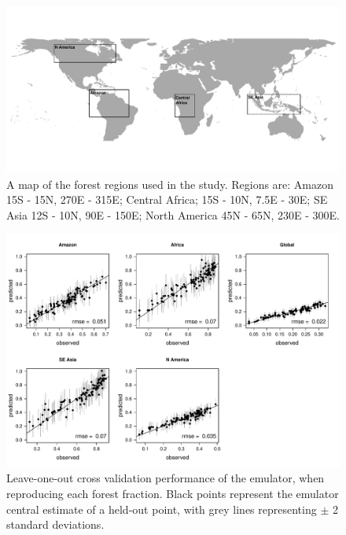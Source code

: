 \documentclass[esd, manuscript]{copernicus} %
\begin{document}
\begin{figure}[t]
\includegraphics[width=12cm]{graphics/map_forests.pdf}
\caption{A map of the forest regions used in the study. Regions are: Amazon 15\textdegree S - 15\textdegree N, 270\textdegree E - 315\textdegree E; Central Africa; 15\textdegree S - 10\textdegree N, 7.5\textdegree E - 30\textdegree E; SE Asia 12\textdegree S - 10\textdegree N, 90\textdegree E - 150\textdegree E; North America 45\textdegree N - 65\textdegree N, 230\textdegree E - 300\textdegree E.}
\label{fig:map_forests}
\end{figure}

\begin{figure}[t]
\includegraphics[width=12cm]{graphics/frac_loo.pdf}
\caption{Leave-one-out cross validation performance of the emulator, when reproducing each forest fraction. Black points represent the emulator central estimate of a held-out point, with grey lines representing $\pm$ 2 standard deviations.}
\label{fig:frac_loo}
\end{figure}
\end{document}
